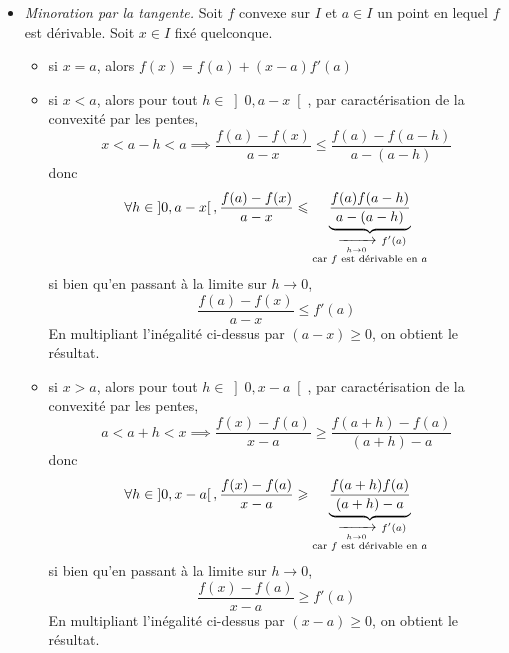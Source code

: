 \documentclass{article}
\begin{document}
\begin{question_kholle}
\begin{itemize}[label=$\vartriangleright$]
		\item \textit{Minoration par la tangente.} Soit $f$ convexe sur $I$ et $a\in I$ un point en lequel $f$ est dérivable. Soit $x\in I$ fixé quelconque.
		      \begin{itemize}
			      \item si $x=a$, alors $f(x)=f(a)+(x-a)f'(a)$
			      \item si $x<a$, alors pour tout $h\in\left]0, a-x\right[$, par caractérisation de la convexité par les pentes,
					            \[
						            x<a-h<a \implies  \frac{f(a)-f(x)}{a-x}\leq \frac{f(a)-f(a-h)}{a-(a-h)}
					            \]
					            donc
					            \[
					            \forall h\in\left]0, a-x\right[, \frac{f(a)-f(x)}{a-x}\leqslant \underbrace{\frac{f(a)f(a-h)}{a-(a-h)}}_{\substack{\ \xrightarrow[\;h \to 0\;]{}\  f'(a)\\ \text{car $f$ est dérivable en $a$}}}
				            \]
				            si bien qu’en passant à la limite sur $h\to 0$,
				            \[
					            \frac{f(a)-f(x)}{a-x}\leq f'(a)
				            \]
				            En multipliant l’inégalité ci-dessus par $(a-x)\geq 0$, on obtient le résultat.
			      \item si $x>a$, alors pour tout $h\in\left]0, x-a\right[$, par caractérisation de la convexité par les pentes,
					            \[
						            a<a+h<x \implies  \frac{f(x)-f(a)}{x-a}\geq \frac{f(a+h)-f(a)}{(a+h)-a}
					            \]
					            donc
					            \[
					            \forall h\in\left]0, x-a\right[, \frac{f(x)-f(a)}{x-a}\geqslant \underbrace{\frac{f(a+h)f(a)}{(a+h)-a}}_{\substack{\ \xrightarrow[\;h \to 0\;]{}\  f'(a)\\ \text{car $f$ est dérivable en $a$}}}
				            \]
				            si bien qu’en passant à la limite sur $h\to 0$,
				            \[
					            \frac{f(x)-f(a)}{x-a}\geq f'(a)
				            \]
				            En multipliant l’inégalité ci-dessus par $(x-a)\geq 0$, on obtient le résultat.

		      \end{itemize}
	\end{itemize}

\end{question_kholle}
\end{document}

